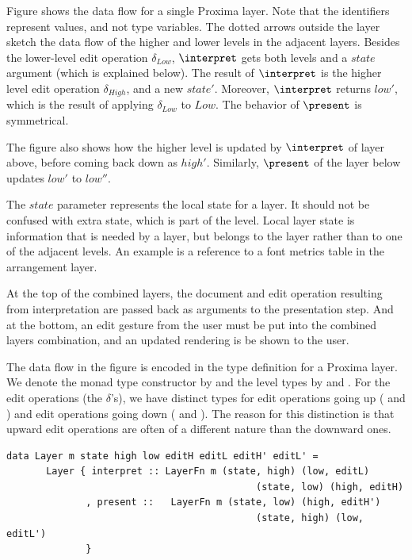 \documentclass[preprint,natbib]{sigplanconf}
\begin{document}
\bc
Figure  shows the data flow for a single Proxima layer. Note that the identifiers represent values, and not type variables. The dotted arrows outside the layer sketch the data flow of the higher and lower levels in the adjacent layers. Besides the lower-level edit operation $\delta_{Low}$, $\interpret$ gets both levels and a $state$ argument (which is explained below). The result of $\interpret$ is the higher level edit operation $\delta_{High}$, and a new $state'$. Moreover, $\interpret$ returns $low'$, which is the result of applying $\delta_{Low}$ to $Low$. The behavior of $\present$ is symmetrical.

The figure also shows how the higher level is updated by $\interpret$ of layer above, before coming back down as $high'$. Similarly, $\present$ of the layer below updates $low'$ to $low''$. 
\ec

The $state$ parameter represents the local state for a layer. It should not be confused with extra state, which is part of the level. Local layer state is information that is needed by a layer, but belongs to the layer rather than to one of the adjacent levels. An example is a reference to a font metrics table in the arrangement layer.

At the top of the combined layers, the document and edit operation resulting from interpretation are passed back as arguments to the presentation step. And at the bottom, an edit gesture from the user must be put into the combined layers combination, and an updated rendering is be shown to the user. 
 

The data flow in the figure is encoded in the type definition for a Proxima layer. We denote the monad type constructor by  and the level types by  and . For the edit operations (the $\delta$'s), we have distinct types for edit operations going up  ( and ) and edit operations going down ( and ). The reason for this distinction is that upward edit operations are often of a different nature than the downward ones.

\begin{small}
\begin{verbatim}
data Layer m state high low editH editL editH' editL' =
       Layer { interpret :: LayerFn m (state, high) (low, editL)
                                            (state, low) (high, editH)
              , present ::   LayerFn m (state, low) (high, editH')
                                            (state, high) (low, editL')
              }
\end{verbatim}
\end{small}
\end{document}
